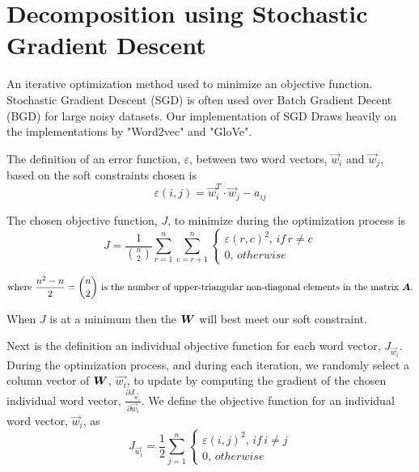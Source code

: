 \documentclass{article}
\begin{document}
\section{Decomposition using Stochastic Gradient Descent}

	An iterative optimization method used to minimize an objective function. Stochastic Gradient Descent (SGD) is often used over Batch Gradient Decent (BGD) for large noisy datasets. Our implementation of SGD Draws heavily on the implementations by "Word2vec" and "GloVe".


The definition of an error function, $\varepsilon$, between two word vectors, $\vec{w}_{i}$ and $\vec{w}_{j}$, based on the soft constraints chosen is
\begin{equation*}
\varepsilon(i,j) = \vec{w}_{i}^T \cdot \vec{w}_{j} - a_{ij}
\end{equation*}

The chosen objective function, $J$, to minimize during the optimization process is
\begin{equation*}
J = \frac{1}{ {n \choose 2} } \sum_{r=1}^{n}{\sum_{c=r+1}^{n}{
\begin{cases}
\varepsilon(r,c)^2, \, if \, r \neq c
\\
0, \, otherwise
\end{cases}
}}
\end{equation*}

\begin{equation*}
\text{where } \frac{n^2 - n}{2} = {n \choose 2} \text{ is the number of upper-triangular non-diagonal elements in the matrix } \boldsymbol{A}.
\end{equation*}

When $J$ is at a minimum then the $\boldsymbol{W}$ will best meet our soft constraint.

Next is the definition an individual objective function for each word vector, $J_{\vec{w}_{i}}$. During the optimization process, and during each iteration, we randomly select a column vector of $\boldsymbol{W}$, $\vec{w_i}$, to update by computing the gradient of the chosen individual word vector, $\frac{\partial J_{\vec{w}_{i}}}{\partial \vec{w}_{i}}$. We define the objective function for an individual word vector, $\vec{w}_{i}$,  as
\begin{equation*}
J_{\vec{w}_{i}} = \frac{1}{2} \sum_{j=1}^{n} {\begin{cases}
\varepsilon(i,j)^2, \, if \, i \neq j
\\
0, \, otherwise
\end{cases}}
\end{equation*}
\end{document}
